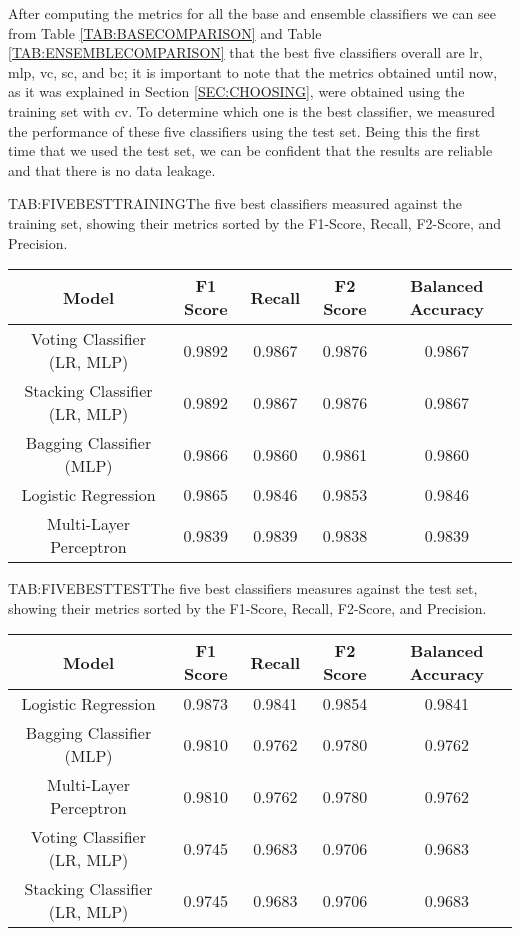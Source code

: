 After computing the metrics for all the base and ensemble classifiers we can see from Table \ref{TAB:BASECOMPARISON} and Table \ref{TAB:ENSEMBLECOMPARISON} that the best five classifiers overall are \acl{lr}, \acl{mlp}, \acl{vc}, \acl{sc}, and \acl{bc}; it is important to note that the metrics obtained until now, as it was explained in Section \ref{SEC:CHOOSING}, were obtained using the training set with \acl{cv}. To determine which one is the best classifier, we measured the performance of these five classifiers using the test set. Being this the first time that we used the test set, we can be confident that the results are reliable and that there is no data leakage. 

\begin{table}[Five Best Classifiers Against Training Set]{TAB:FIVEBESTTRAINING}{The five best classifiers measured against the training set, showing their metrics sorted by the F1-Score, Recall, F2-Score, and Precision.}
    \small
    \begin{tabular}{|c|c|c|c|c|}
        \hline
        \textbf{Model} & \textbf{F1 Score} & \textbf{Recall} & \textbf{F2 Score} & \textbf{Balanced Accuracy} \\
        \hline
        Voting Classifier (LR, MLP)   & 0.9892 & 0.9867 & 0.9876 & 0.9867 \\
        Stacking Classifier (LR, MLP) & 0.9892 & 0.9867 & 0.9876 & 0.9867 \\
        Bagging Classifier (MLP)      & 0.9866 & 0.9860 & 0.9861 & 0.9860 \\
        Logistic Regression           & 0.9865 & 0.9846 & 0.9853 & 0.9846 \\
        Multi-Layer Perceptron        & 0.9839 & 0.9839 & 0.9838 & 0.9839 \\
        \hline
    \end{tabular}
\end{table}

\begin{table}[Five Best Classifiers Against Test Set]{TAB:FIVEBESTTEST}{The five best classifiers measures against the test set, showing their metrics sorted by the F1-Score, Recall, F2-Score, and Precision.}
    \small
    \begin{tabular}{|c|c|c|c|c|}
        \hline
        \textbf{Model} & \textbf{F1 Score} & \textbf{Recall} & \textbf{F2 Score} & \textbf{Balanced Accuracy} \\
        \hline
        Logistic Regression           & 0.9873 & 0.9841 & 0.9854 & 0.9841 \\
        Bagging Classifier (MLP)      & 0.9810 & 0.9762 & 0.9780 & 0.9762 \\
        Multi-Layer Perceptron        & 0.9810 & 0.9762 & 0.9780 & 0.9762 \\
        Voting Classifier (LR, MLP)   & 0.9745 & 0.9683 & 0.9706 & 0.9683 \\
        Stacking Classifier (LR, MLP) & 0.9745 & 0.9683 & 0.9706 & 0.9683 \\
        \hline
    \end{tabular}
\end{table}

